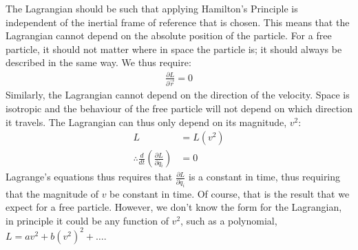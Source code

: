 The Lagrangian should be such that applying Hamilton's Principle is independent of the inertial frame of reference that is chosen. This means that the Lagrangian cannot depend on the absolute position of the particle. For a free particle, it should not matter where in space the particle is; it should always be described in the same way. We thus require:
\begin{align}
\frac{\partial L}{\partial \vec{r}}=0
\end{align}
Similarly, the Lagrangian cannot depend on the direction of the velocity. Space is isotropic and the behaviour of the free particle will not depend on which direction it travels. The Lagrangian can thus only depend on its magnitude, $v^2$:
\begin{align}
L&=L(v^2)\\
\therefore \frac{d}{dt}\left(\frac{\partial L}{\partial \dot{q_i}} \right)&=0
\end{align}
Lagrange's equations thus requires that $\frac{\partial L}{\partial \dot{q_i}}$ is a constant in time, thus requiring that the magnitude of $v$ be constant in time. Of course, that is the result that we expect for a free particle. However, we don't know the form for the Lagrangian, in principle it could be any function of $v^2$, such as a polynomial, $L=av^2+b(v^2)^2+\dots$.

